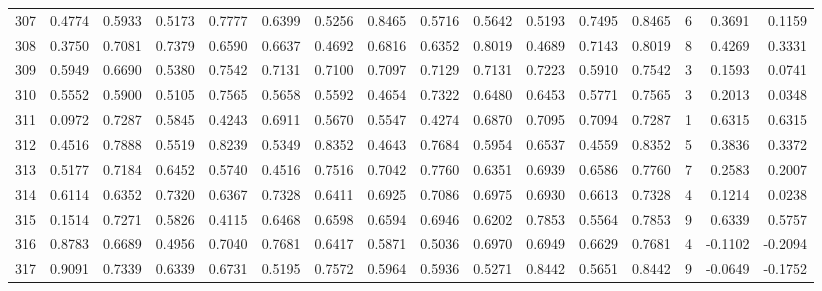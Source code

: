 \begin{tabular}{lrrrrrrrrrrrrrrr}
307 &      0.4774 &  0.5933 &  0.5173 &  0.7777 &  0.6399 &  0.5256 &  0.8465 &  0.5716 &  0.5642 &  0.5193 &   0.7495 &     0.8465 &      6 &                    0.3691 &                     0.1159 \\
308 &      0.3750 &  0.7081 &  0.7379 &  0.6590 &  0.6637 &  0.4692 &  0.6816 &  0.6352 &  0.8019 &  0.4689 &   0.7143 &     0.8019 &      8 &                    0.4269 &                     0.3331 \\
309 &      0.5949 &  0.6690 &  0.5380 &  0.7542 &  0.7131 &  0.7100 &  0.7097 &  0.7129 &  0.7131 &  0.7223 &   0.5910 &     0.7542 &      3 &                    0.1593 &                     0.0741 \\
310 &      0.5552 &  0.5900 &  0.5105 &  0.7565 &  0.5658 &  0.5592 &  0.4654 &  0.7322 &  0.6480 &  0.6453 &   0.5771 &     0.7565 &      3 &                    0.2013 &                     0.0348 \\
311 &      0.0972 &  0.7287 &  0.5845 &  0.4243 &  0.6911 &  0.5670 &  0.5547 &  0.4274 &  0.6870 &  0.7095 &   0.7094 &     0.7287 &      1 &                    0.6315 &                     0.6315 \\
312 &      0.4516 &  0.7888 &  0.5519 &  0.8239 &  0.5349 &  0.8352 &  0.4643 &  0.7684 &  0.5954 &  0.6537 &   0.4559 &     0.8352 &      5 &                    0.3836 &                     0.3372 \\
313 &      0.5177 &  0.7184 &  0.6452 &  0.5740 &  0.4516 &  0.7516 &  0.7042 &  0.7760 &  0.6351 &  0.6939 &   0.6586 &     0.7760 &      7 &                    0.2583 &                     0.2007 \\
314 &      0.6114 &  0.6352 &  0.7320 &  0.6367 &  0.7328 &  0.6411 &  0.6925 &  0.7086 &  0.6975 &  0.6930 &   0.6613 &     0.7328 &      4 &                    0.1214 &                     0.0238 \\
315 &      0.1514 &  0.7271 &  0.5826 &  0.4115 &  0.6468 &  0.6598 &  0.6594 &  0.6946 &  0.6202 &  0.7853 &   0.5564 &     0.7853 &      9 &                    0.6339 &                     0.5757 \\
316 &      0.8783 &  0.6689 &  0.4956 &  0.7040 &  0.7681 &  0.6417 &  0.5871 &  0.5036 &  0.6970 &  0.6949 &   0.6629 &     0.7681 &      4 &                   -0.1102 &                    -0.2094 \\
317 &      0.9091 &  0.7339 &  0.6339 &  0.6731 &  0.5195 &  0.7572 &  0.5964 &  0.5936 &  0.5271 &  0.8442 &   0.5651 &     0.8442 &      9 &                   -0.0649 &                    -0.1752 \\

\end{tabular}

